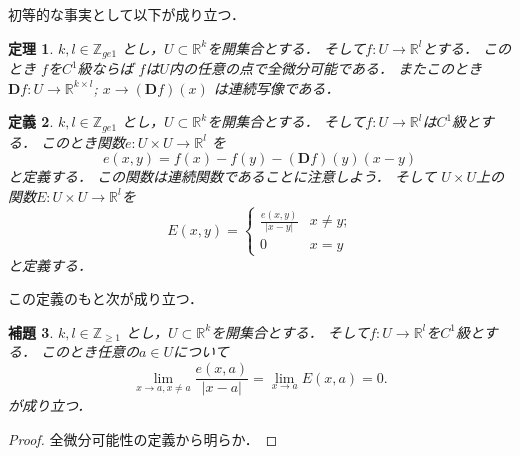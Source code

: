 \documentclass[leqno, a4paper, 12pt]{jsarticle}
\newtheorem{thm}{定理}
\newtheorem{lem}[thm]{補題}
\newtheorem{df}[thm]{定義}
\newcommand{\zz}{\mathbb{Z}}
\newcommand{\rr}{\mathbb{R}}
\newcommand{\ddd}{\mathbf{D}}
\begin{document}
初等的な事実として以下が成り立つ．
\begin{thm}
$k, l\in \zz_{ge 1}$
とし，$U\subset \rr^{k}$を開集合とする．
そして$f: U\to \rr^{l}$とする．
このとき
$f$を$C^{1}$級ならば
$f$は$U$内の任意の点で全微分可能である．
またこのとき$\ddd f: U\to \rr^{k\times l}$; 
$x\to (\ddd f)(x)$
は連続写像である．
\end{thm}


\begin{df}
$k, l\in \zz_{ge 1}$
とし，$U\subset \rr^{k}$を開集合とする．
そして$f: U\to \rr^{l}$は$C^{1}$級とする．
このとき関数$e: U\times U\to \rr^{l}$
を
\[
e(x, y)=f(x)-f(y)-(\ddd f)(y)(x-y)
\]
と定義する．
この関数は連続関数であることに注意しよう．
そして
$U\times U$上の
関数$E: U\times U\to \rr^{l}$を
\[
E(x, y)=
\begin{cases}
\frac{e(x, y)}{|x-y|} & \text{$x\neq y$;}\\
0 & \text{$x=y$}
\end{cases}
\]
と定義する．
\end{df}

この定義のもと次が成り立つ．
\begin{lem}\label{lem:1step}
$k, l\in \zz_{\ge 1}$
とし，$U\subset \rr^{k}$を開集合とする．
そして$f: U\to \rr^{l}$を$C^{1}$級とする．
このとき任意の$a\in U$について
\[
\lim_{x\to a, x\neq a}\frac{e(x, a)}{|x-a|}
=\lim_{x\to a}E(x, a)=0. 
\]
が成り立つ．

\end{lem}
\begin{proof}
全微分可能性の定義から明らか．
\end{proof}
\end{document}
